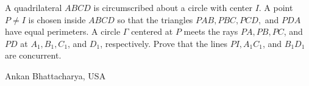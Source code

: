 A quadrilateral $ABCD$ is circumscribed about a circle with center $I$. A point $P \ne I$ is chosen inside $ABCD$ so that the triangles $PAB, PBC, PCD,$ and $PDA$ have equal perimeters. A circle $\Gamma$ centered at $P$ meets the rays $PA, PB, PC$, and $PD$ at $A_1, B_1, C_1$, and $D_1$, respectively. Prove that the lines $PI, A_1C_1$, and $B_1D_1$ are concurrent.

Ankan Bhattacharya, USA